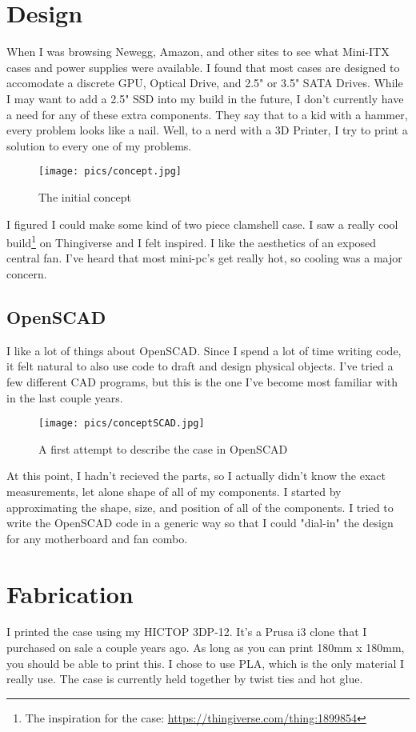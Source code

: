 \documentclass{article}
\begin{document}
\section{Design}
When I was browsing Newegg, Amazon, and other sites to see what Mini-ITX cases and power supplies were available. I found that most cases are designed to accomodate a discrete GPU, Optical Drive, and 2.5" or 3.5" SATA Drives. While I may want to add a 2.5" SSD into my build in the future, I don't currently have a need for any of these extra components. They say that to a kid with a hammer, every problem looks like a nail. Well, to a nerd with a 3D Printer, I try to print a solution to every one of my problems.
\begin{figure}[h]
\texttt{[image: pics/concept.jpg]}
\caption{The initial concept}
\end{figure}

I figured I could make some kind of two piece clamshell case. I saw a really cool build\footnote{The inspiration for the case: \url{https://thingiverse.com/thing:1899854}} on Thingiverse and I felt inspired. I like the aesthetics of an exposed central fan. I've heard that most mini-pc's get really hot, so cooling was a major concern.

\subsection{OpenSCAD}
I like a lot of things about OpenSCAD. Since I spend a lot of time writing code, it felt natural to also use code to draft and design physical objects. I've tried a few different CAD programs, but this is the one I've become most familiar with in the last couple years.

\begin{figure}[h]
\texttt{[image: pics/conceptSCAD.jpg]}
\caption{A first attempt to describe the case in OpenSCAD}
\end{figure}
At this point, I hadn't recieved the parts, so I actually didn't know the exact measurements, let alone shape of all of my components. I started by approximating the shape, size, and position of all of the components. I tried to write the OpenSCAD code in a generic way so that I could "dial-in" the design for any motherboard and fan combo.
 
\section{Fabrication}
I printed the case using my HICTOP 3DP-12. It's a Prusa i3 clone that I purchased on sale a couple years ago. As long as you can print 180mm x 180mm, you should be able to print this. I chose to use PLA, which is the only material I really use. The case is currently held together by twist ties and hot glue.
\end{document}
